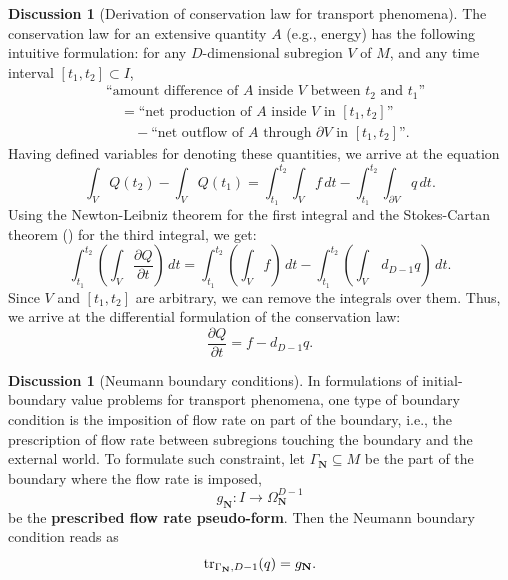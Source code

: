 \documentclass{elsarticle}
\theoremstyle{definition}
\newtheorem{discussion}[theorem]{Discussion}
\newcommand{\tr}{\mathop{\rm tr}\nolimits}
\newcommand{\newterm}[1]{\textbf{#1}}
\newcommand{\Neumann}{\mathbf{N}}
\begin{document}
\begin{discussion}[Derivation of conservation law for transport phenomena]
  The conservation law for an extensive quantity $A$ (e.g., energy) has the following intuitive formulation:
  for any $D$-dimensional subregion $V$ of $M$, and any time interval $[t_1, t_2] \subset I$,
  \begin{equation}
    \begin{split}
      & \text{``amount difference of $A$ inside $V$ between $t_2$ and $t_1$''} \\
      & \quad = \text{``net production of $A$ inside $V$ in $[t_1, t_2]$''} \\
      & \quad \quad - \text{``net outflow of $A$ through $\partial V$ in $[t_1, t_2]$''}.
    \end{split}
  \end{equation}
  Having defined variables for denoting these quantities, we arrive at the equation
  \begin{equation}
    \label{eq:continuum/conservation_law_integral_form}
    \int_V Q(t_2) - \int_V Q(t_1) = \int_{t_1}^{t_2} \int_V f \, dt - \int_{t_1}^{t_2} \int_{\partial V} q\, d t.
  \end{equation}
  Using the Newton-Leibniz theorem for the first integral and the Stokes-Cartan theorem
  ()
  for the third integral, we get:
  \begin{equation}
    \int_{t_1}^{t_2} \left(\int_V \frac{\partial Q}{\partial t}\right)\, d t = \int_{t_1}^{t_2} \left(\int_V f\right)\, d t - \int_{t_1}^{t_2} \left(\int_V\, d_{D - 1} q\right)\, d t.
  \end{equation}
  Since $V$ and $[t_1, t_2]$ are arbitrary, we can remove the integrals over them.
  Thus, we arrive at the differential formulation of the conservation law:
  \begin{equation}
    \label{eq:continuum/conservation_law_differential_form}
    \frac{\partial Q}{\partial t} = f - d_{D - 1} q.
  \end{equation}
\end{discussion}
\begin{discussion}[Neumann boundary conditions]
  In formulations of initial-boundary value problems for transport phenomena, one type of boundary condition is the imposition of flow rate on part of the boundary, i.e., the prescription of flow rate between subregions touching the boundary and the external world.
  To formulate such constraint, let $\Gamma_{\Neumann} \subseteq M$ be the part of the boundary where the flow rate is imposed,
  \begin{equation}
    \label{eq:continuum/prescribed_neumann_condition_definition}
    g_{\Neumann} \colon I \to \Omega^{D - 1}_{\Neumann}
  \end{equation}
  be the \newterm{prescribed flow rate pseudo-form}.
  Then the Neumann boundary condition reads as
  \begin{equation}
    \label{eq:continuum/neumann_boundary_condition}
    \tr_{\Gamma_{\Neumann}, D - 1}(q) = g_{\Neumann}.
  \end{equation}
\end{discussion}
\end{document}
